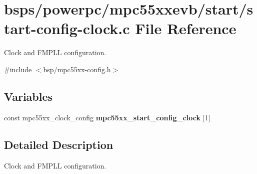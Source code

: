 \hypertarget{start-config-clock_8c}{}\section{bsps/powerpc/mpc55xxevb/start/start-\/config-\/clock.c File Reference}
\label{start-config-clock_8c}


Clock and F\+M\+P\+LL configuration.  


{\ttfamily \#include $<$bsp/mpc55xx-\/config.\+h$>$}\newline
\subsection*{Variables}
\begin{DoxyCompactItemize}
\item 
\mbox{\label{start-config-clock_8c_a3a88f20f752f08a25a229da27519b098}} 
const mpc55xx\+\_\+clock\+\_\+config {\bfseries mpc55xx\+\_\+start\+\_\+config\+\_\+clock} \mbox{[}1\mbox{]}
\end{DoxyCompactItemize}


\subsection{Detailed Description}
Clock and F\+M\+P\+LL configuration. 

